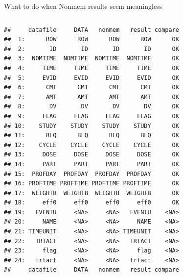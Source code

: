\documentclass[
  8pt,
  ignorenonframetext,
  aspectratio=169]{beamer}
\begin{document}
\begin{frame}[fragile]{What to do when Nonmem results seem meaningless}
\begin{columns}[T]
\begin{column}{0.48\textwidth}
\begin{verbatim}
##     datafile     DATA   nonmem   result compare
##  1:      ROW      ROW      ROW      ROW      OK
##  2:       ID       ID       ID       ID      OK
##  3:  NOMTIME  NOMTIME  NOMTIME  NOMTIME      OK
##  4:     TIME     TIME     TIME     TIME      OK
##  5:     EVID     EVID     EVID     EVID      OK
##  6:      CMT      CMT      CMT      CMT      OK
##  7:      AMT      AMT      AMT      AMT      OK
##  8:       DV       DV       DV       DV      OK
##  9:     FLAG     FLAG     FLAG     FLAG      OK
## 10:    STUDY    STUDY    STUDY    STUDY      OK
## 11:      BLQ      BLQ      BLQ      BLQ      OK
## 12:    CYCLE    CYCLE    CYCLE    CYCLE      OK
## 13:     DOSE     DOSE     DOSE     DOSE      OK
## 14:     PART     PART     PART     PART      OK
## 15:  PROFDAY  PROFDAY  PROFDAY  PROFDAY      OK
## 16: PROFTIME PROFTIME PROFTIME PROFTIME      OK
## 17:  WEIGHTB  WEIGHTB  WEIGHTB  WEIGHTB      OK
## 18:     eff0     eff0     eff0     eff0      OK
## 19:   EVENTU     <NA>     <NA>   EVENTU    <NA>
## 20:     NAME     <NA>     <NA>     NAME    <NA>
## 21: TIMEUNIT     <NA>     <NA> TIMEUNIT    <NA>
## 22:   TRTACT     <NA>     <NA>   TRTACT    <NA>
## 23:     flag     <NA>     <NA>     flag    <NA>
## 24:   trtact     <NA>     <NA>   trtact    <NA>
##     datafile     DATA   nonmem   result compare
\end{verbatim}

\normalsize
\end{column}
\end{columns}
\end{frame}
\end{document}
